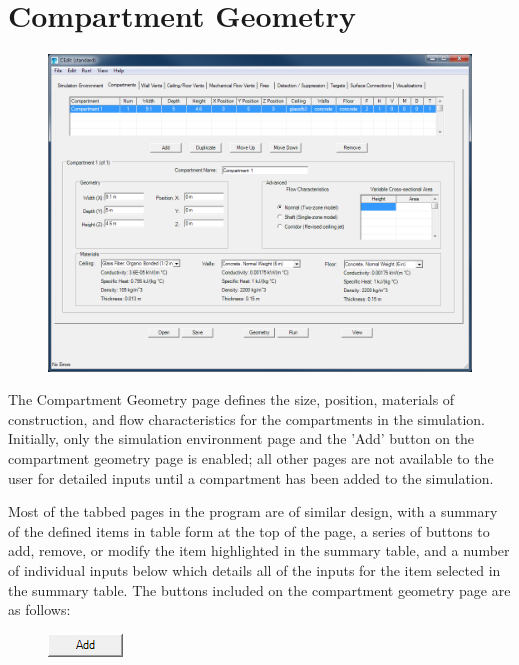 \section{Compartment Geometry}

\begin{figure}[h!]
\begin{center}
\includegraphics[width=6.5in]{FIGURES/Input_File/Compartment_Geometry_Tab}
\end{center}
\end{figure}

The Compartment Geometry page defines the size, position, materials of construction, and flow characteristics for the compartments in the simulation. Initially, only the simulation environment page and the 'Add' button on the compartment geometry page is enabled; all other pages are not available to the user for detailed inputs until a compartment has been added to the simulation.

Most of the tabbed pages in the program are of similar design, with a summary of the defined items in table form at the top of the page, a series of buttons to add, remove, or modify the item highlighted in the summary table, and a number of individual inputs below which details all of the inputs for the item selected in the summary table. The buttons included on the compartment geometry page are as follows: \\

\begin{figure}
  \includegraphics[width=0.781in]{FIGURES/Input_File/Add_Button}
\end{figure}


